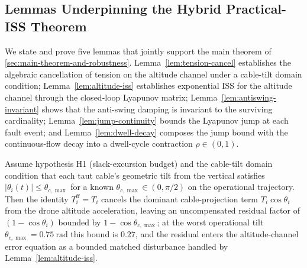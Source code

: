 \subsection{Lemmas Underpinning the Hybrid Practical-ISS Theorem}
\label{sec:five-lemmas}

We state and prove five lemmas that jointly support the main theorem of \cref{sec:main-theorem-and-robustness}. Lemma~\ref{lem:tension-cancel} establishes the algebraic cancellation of tension on the altitude channel under a cable-tilt domain condition; Lemma~\ref{lem:altitude-iss} establishes exponential ISS for the altitude channel through the closed-loop Lyapunov matrix; Lemma~\ref{lem:antiswing-invariant} shows that the anti-swing damping is invariant to the surviving cardinality; Lemma~\ref{lem:jump-continuity} bounds the Lyapunov jump at each fault event; and Lemma~\ref{lem:dwell-decay} composes the jump bound with the continuous-flow decay into a dwell-cycle contraction $\rho \in (0, 1)$.

\begin{lemma}
\label{lem:tension-cancel}
Assume hypothesis H1 (slack-excursion budget) and the cable-tilt domain condition that each taut cable's geometric tilt from the vertical satisfies $|\theta_i(t)| \le \theta_{c,\max}$ for a known $\theta_{c,\max} \in (0, \pi/2)$ on the operational trajectory. Then the identity $T_i^{\mathrm{ff}} = T_i$ cancels the dominant cable-projection term $T_i\cos\theta_i$ from the drone altitude acceleration, leaving an uncompensated residual factor of $(1 - \cos\theta_i)$ bounded by $1 - \cos\theta_{c,\max}$; at the worst operational tilt $\theta_{c,\max} = \SI{0.75}{\radian}$ this bound is $0.27$, and the residual enters the altitude-channel error equation as a bounded matched disturbance handled by Lemma~\ref{lem:altitude-iss}.
\end{lemma}

